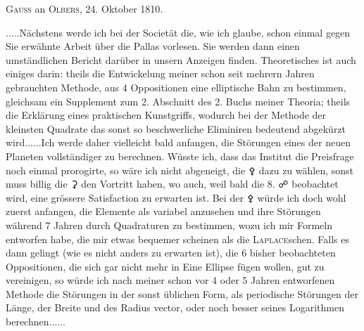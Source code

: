 \par\bigskip
\begin{center}
\textsc{Gauss} an \textsc{Olbers}, 24. Oktober 1810.
\end{center}
\noindent\hspace*{\parindent}.\quad.\quad.\quad.\quad.\quad Nächstens werde ich bei der Societät die, wie ich glaube, schon einmal gegen Sie erwähnte Arbeit\HistoricalNoteEight{Vgl. Band VI, S. 1.]} über die Pallas vorlesen. Sie werden dann einen umständlichen Bericht darüber in unsern Anzeigen finden. Theoretisches ist auch einiges darin: theils die Entwickelung meiner schon seit mehrern Jahren gebrauchten Methode, aus 4 Oppositionen eine elliptische Bahn zu bestimmen, gleichsam ein Supplement zum 2. Abschnitt des 2. Buchs meiner Theoria; theils die Erklärung eines praktischen Kunstgriffs, wodurch bei der Methode der kleinsten Quadrate das sonst so beschwerliche Eliminiren bedeutend abgekürzt wird.\quad.\quad.\quad.\quad.\quad.\quad Ich werde daher vielleicht bald anfangen, die Störungen eines der neuen Planeten vollständiger zu berechnen. Wüsste ich, dass das Institut die Preisfrage noch einmal prorogirte, so wäre ich nicht abgeneigt, die {\AstroSymbols ⚴} dazu zu wählen, sonst muss billig die {\AstroSymbols ⚳} den Vortritt haben, wo auch, weil bald die 8. {\AstroSymbols ☍} beobachtet wird, eine grössere Satisfaction zu erwarten ist. Bei der {\AstroSymbols ⚴} würde ich doch wohl zuerst anfangen, die Elemente als variabel anzusehen und ihre Störungen während 7 Jahren durch Quadraturen zu bestimmen, wozu ich mir Formeln entworfen habe, die mir etwas bequemer scheinen als die \textsc{Laplace}schen. Falls es dann gelingt (wie es nicht anders zu erwarten ist), die 6 bisher beobachteten Oppositionen, die sich gar nicht mehr in Eine Ellipse fügen wollen, gut zu vereinigen, so würde ich nach meiner schon vor 4 oder 5 Jahren entworfenen Methode die Störungen in der sonst üblichen Form, als periodische Störungen der Länge, der Breite und des Radius vector, oder noch besser seines Logarithmen berechnen.\quad.\quad.\quad.\quad.\quad.
\par
